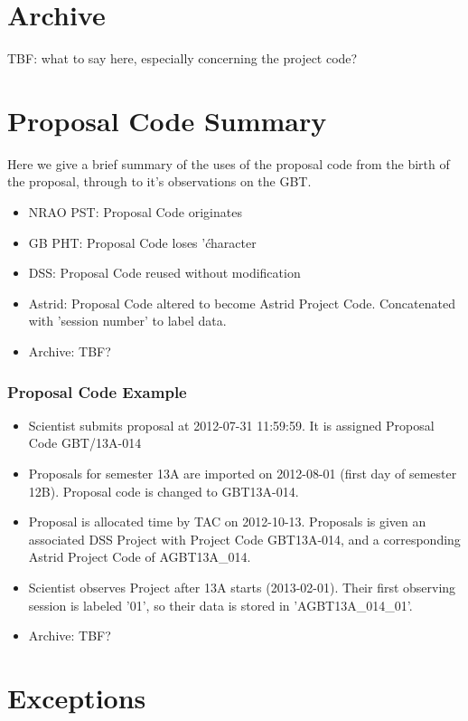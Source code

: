 \documentclass{article}
\begin{document}
\section{Archive}\label{archive_sec}

TBF: what to say here, especially concerning the project code?

\section{Proposal Code Summary}\label{pcode_summary_sec}

Here we give a brief summary of the uses of the proposal code from the birth
of the proposal, through to it's observations on the GBT.
\begin{itemize}
\item NRAO PST: Proposal Code originates
\item GB PHT: Proposal Code loses '\' character
\item DSS: Proposal Code reused without modification
\item Astrid: Proposal Code altered to become Astrid Project Code.
Concatenated with 'session number' to label data.
\item Archive: TBF?
\end{itemize}

\subsubsection{Proposal Code Example}

\begin{itemize}
\item Scientist submits proposal at 2012-07-31 11:59:59.  It is assigned
Proposal Code GBT/13A-014
\item Proposals for semester 13A are imported on 2012-08-01 (first day of semester 12B).  Proposal code is changed to GBT13A-014.
\item Proposal is allocated time by TAC on 2012-10-13.  Proposals is given an associated DSS Project with Project Code GBT13A-014, and a corresponding Astrid Project Code of AGBT13A\_014.
\item Scientist observes Project after 13A starts (2013-02-01).  Their first observing session is labeled '01', so their data is stored in 'AGBT13A\_014\_01'.
\item Archive: TBF?
\end{itemize}

\section{Exceptions}\label{exceptions_sec}
\end{document}
